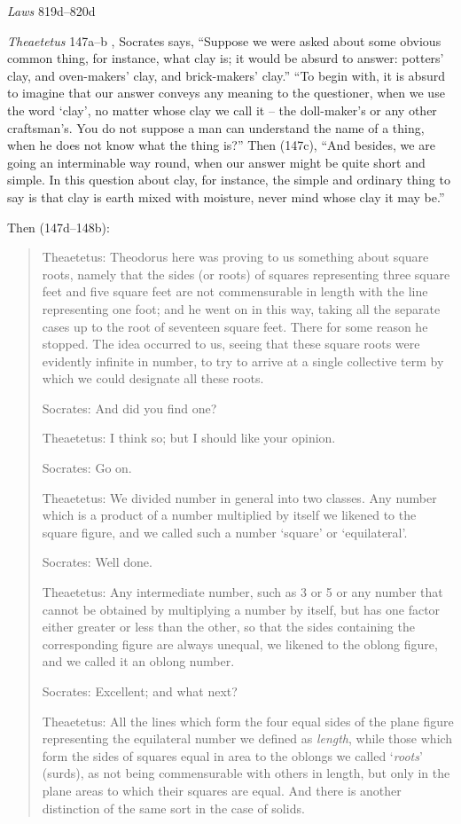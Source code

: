 \documentclass{amsart}
\theoremstyle{definition}
\begin{document}
{\em Laws} 819d--820d


{\em Theaetetus} 147a--b \cite[p.~22]{theaetetus}, Socrates says, ``Suppose we were asked about some obvious common thing, for instance, what clay is; it would be absurd to answer: potters' clay, and
oven-makers' clay, and brick-makers' clay.'' ``To begin with, it is absurd to imagine that our  answer conveys any meaning to the questioner, when we use the word
`clay', no matter whose clay we call it --  the doll-maker's or any other craftsman's. You do not suppose a man can understand the name of a thing, when he does not
know what the thing is?'' Then (147c), ``And besides, we are going an interminable way round, when our answer might be quite short and simple. In this question about clay,
for instance, the simple and ordinary thing to say is that clay is earth mixed with moisture, never mind whose clay it may be.''

Then  (147d--148b):

\begin{quote}
Theaetetus: Theodorus here was proving to us something about square roots, namely that the sides (or roots) of squares representing three square feet and five square feet
are not commensurable in length with the line representing one foot; and he went on in this way, taking all the separate cases up to the root of seventeen square feet. There for
some reason he stopped. The idea occurred to us, seeing that these square roots were evidently infinite in number, to try to arrive at a single collective term by which we could
designate all these roots.

Socrates: And did you find one?

Theaetetus: I think so; but I should like your opinion.

Socrates: Go on.

Theaetetus: We divided number in general into two classes. Any number which is a product of a number multiplied by itself we likened to the square figure, and we called
such a number `square' or `equilateral'.

Socrates: Well done.

Theaetetus: Any intermediate number, such as 3 or 5 or any number that cannot be obtained by multiplying a number by itself, but has one factor either greater
or less than the other, so that the sides containing the corresponding figure are always unequal, we likened to the oblong figure, and we called it an oblong number.

Socrates: Excellent; and what next?

Theaetetus: All the lines which form the four equal sides of the plane figure representing the equilateral number we defined as {\em length}, while those
which form the sides of squares equal in area to the oblongs we called `{\em roots}' (surds), as not being commensurable with others in length, but only in the
plane areas to which their squares are equal. And there is another distinction of the same sort in the case of solids.
\end{quote}
\end{document}
